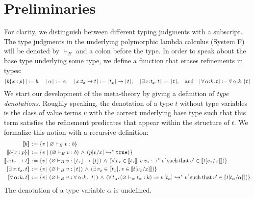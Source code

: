 \documentclass[11pt]{article}
\newcommand{\al}{\alpha}
\newcommand{\bind}{\hspace{0.05em}{:}\hspace{0.05em}} %
\newcommand{\col}{\mathbin{:}}       %
\newcommand{\lb}{\llbracket}         %
\newcommand{\rb}{\rrbracket}         %
\newcommand{\many}{\hookrightarrow^*}
\newcommand{\polytype}[3]{\forall\, #1\bind #2.\, #3}
\begin{document}
\section{Preliminaries}   %

For clarity, we distinguish between different typing judgments with a subscript.  The type judgments in the underlying polymorphic lambda calculus (System F) will be denoted by $\vdash_B$ and a colon before the type. In order to speak about the base type underlying some type, we define a function that erases refinements in types:
\[
\lfloor b\{x:p\} \rfloor := b, \quad \lfloor \al \rfloor := \al, \quad
\lfloor x\bind t_x \rightarrow t\rfloor := \lfloor t_x \rfloor \rightarrow \lfloor t \rfloor, \quad
\lfloor \exists\, x\bind t_x.\, t\rfloor := \lfloor t\rfloor,
\quad{\rm and}\quad
\lfloor \polytype{\al}{k}{t} \rfloor := \polytype{\al}{k}{\lfloor t\rfloor}
\]
We start our development of the meta-theory by giving a definition of {\em type denotations}. Roughly speaking, the denotation of a type $t$ without type variables is the class of value terms $v$ with the correct underlying base type such that this term satisfies the refinement predicates that appear within the structure of $t$. We formalize this notion with a recursive definition:
\begin{align*}
\lb b \rb \,&:= \{ v \;|\; \varnothing \vdash_B v : b\}\\
\lb b\{x\col p\}\rb \,&:= 
  \{ v \;|\; (\varnothing \vdash_B v:b)
\,\wedge\, (%
p[v/x] \many {\tt true})\} \\
\lb x\bind t_x \rightarrow t\rb \,&:= 
\{ v\,|\; (\varnothing \vdash_B v : \lfloor t_x\rfloor \rightarrow \lfloor t\rfloor ) \,\wedge\,
( \forall\, v_x \in \lb t_x \rb.\, v\; v_x \many v' \,{\rm such\, that}\, v' \in \lb t[v_x/x] \rb)\} 
\\
\lb \exists\, x\bind t_x .\, t\rb \,&:= 
\{ v \,|\; (\varnothing \vdash_B v : \lfloor t\rfloor ) \,\wedge\,
( \exists\, v_x \in \lb t_x \rb.\, v\in \lb t[v_x/x] \rb)\}
\\
\lb\polytype{\al}{k}{t}\rb \,&:= \{ v \,|\; 
( \varnothing \vdash_B v : \polytype{\al}{k}{\lfloor t \rfloor}) \,\wedge\,
( \forall\, t_\al.\, (\varnothing \vdash_w t_\al : k) \Rightarrow 
v\, [t_\al] \many v' \,{\rm such\, that}\, v' \in \lb t [t_\al/\al] \rb)
\}
\end{align*}
The denotation of a type variable $\al$ is undefined.
\end{document}
